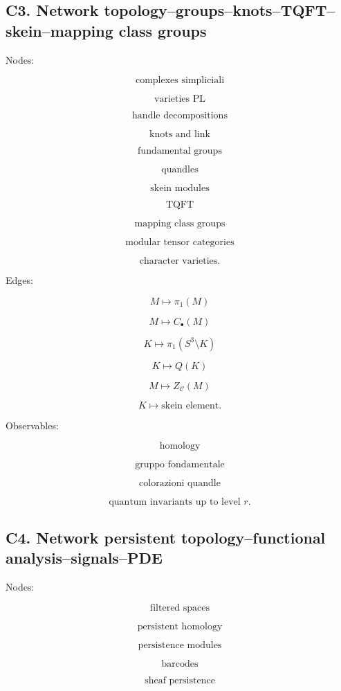 \documentclass[11pt]{article}
\begin{document}
\subsection{C3. Network topology--groups--knots--TQFT--skein--mapping class groups}

Nodes:

\[
\text{complexes simpliciali}
\]

\[
\text{varieties PL}
\]

\[
\text{handle decompositions}
\]

\[
\text{knots and link}
\]

\[
\text{fundamental groups}
\]

\[
\text{quandles}
\]

\[
\text{skein modules}
\]

\[
\text{TQFT}
\]

\[
\text{mapping class groups}
\]

\[
\text{modular tensor categories}
\]

\[
\text{character varieties}.
\]

Edges:

\[
M\mapsto \pi_1(M)
\]

\[
M\mapsto C_\bullet(M)
\]

\[
K\mapsto \pi_1(S^3\setminus K)
\]

\[
K\mapsto Q(K)
\]

\[
M\mapsto Z_{\mathcal C}(M)
\]

\[
K\mapsto \text{skein element}.
\]

Observables:

\[
\text{homology}
\]

\[
\text{gruppo fondamentale}
\]

\[
\text{colorazioni quandle}
\]

\[
\text{quantum invariants up to level }r.
\]



\subsection{C4. Network persistent topology--functional analysis--signals--PDE}

Nodes:

\[
\text{filtered spaces}
\]

\[
\text{persistent homology}
\]

\[
\text{persistence modules}
\]

\[
\text{barcodes}
\]

\[
\text{sheaf persistence}
\]
\end{document}
